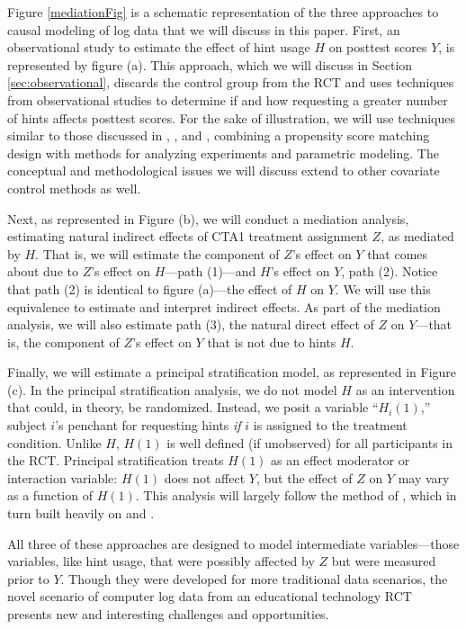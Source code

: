 \documentclass{article}\usepackage[]{graphicx}\usepackage[]{color}
\begin{document}
Figure \ref{mediationFig} is a schematic representation of the three
approaches to causal modeling of log data that we will discuss in this
paper.
First, an observational study to estimate the effect of hint usage $H$
on posttest scores $Y$, is represented by figure (a).
This approach, which we will discuss in Section
\ref{sec:observational}, discards the control group from the RCT and
uses techniques from observational studies to determine if and how requesting
a greater number of hints affects posttest scores.
For the sake of illustration, we will use techniques similar to those
discussed in \citet{rosenbaum2002observational},
 \citet{hansen2009b}, and \citet{ho:etal:2007}, combining a propensity
 score matching design with methods for analyzing experiments and
 parametric modeling.
The conceptual and methodological issues we will discuss extend to
other covariate control methods as well.

Next, as represented in Figure (b), we will conduct a mediation analysis, estimating natural
indirect effects of CTA1 treatment assignment $Z$, as mediated by
$H$. That is, we will estimate the component of $Z$'s effect on $Y$ that comes about
due to $Z$'s effect on $H$---path (1)---and $H$'s effect on $Y$, path
(2).
Notice that path (2) is identical to figure (a)---the effect of $H$ on
$Y$.
We will use this equivalence to estimate and interpret indirect
effects.
As part of the mediation analysis, we will also estimate path (3), the
natural direct effect of $Z$ on $Y$---that is, the component of $Z$'s
effect on $Y$ that is not due to hints $H$.

Finally, we will estimate a principal stratification model, as represented in Figure
(c).
In the principal stratification analysis, we do not model $H$ as an
intervention that could, in theory, be randomized.
Instead, we posit a variable ``$H_i(1)$,''  subject $i$'s penchant for
requesting hints \emph{if} $i$ is assigned to the treatment
condition.
Unlike $H$, $H(1)$ is well defined (if
unobserved) for all participants in the RCT.
Principal stratification treats $H(1)$ as an effect moderator or
interaction variable: $H(1)$ does not affect $Y$, but the effect of
$Z$ on $Y$ may vary as a function of $H(1)$.
This analysis will largely follow the method of \citet{aoas}, which in
turn built heavily on \citet{schwartz2011bayesian} and
\citet{jin2008principal}.

All three of these approaches are designed to model intermediate
variables---those variables, like hint usage,
that were possibly affected by $Z$ but were measured prior to $Y$.
Though they were developed for more traditional data scenarios, the
novel scenario of computer log data from an educational technology RCT
presents new and interesting challenges and opportunities.
\end{document}
